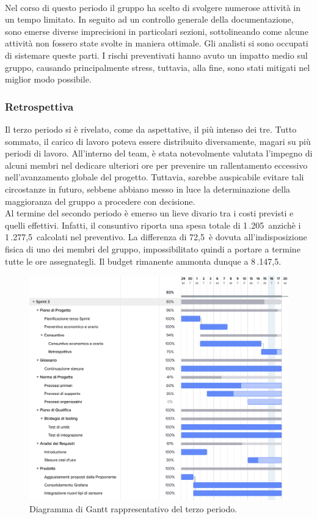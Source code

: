 \\Nel corso di questo periodo il gruppo ha scelto di svolgere numerose attivit\`{a} in un tempo limitato.
In seguito ad un controllo generale della documentazione, sono emerse diverse imprecisioni in
particolari sezioni, sottolineando come alcune attivit\`{a} non fossero state svolte in maniera
ottimale. Gli analisti si sono occupati di sistemare queste parti. I rischi preventivati hanno avuto un impatto medio sul gruppo, causando principalmente stress, tuttavia, alla fine, sono stati mitigati nel miglior modo possibile.
\subsubsection{Retrospettiva}
Il terzo periodo si è rivelato, come da aspettative, il pi\`{u} intenso dei tre. Tutto sommato, il
carico di lavoro poteva essere distribuito diversamente, magari su pi\`{u} periodi di lavoro.
All'interno del team, è stata notevolmente valutata l'impegno di alcuni membri nel dedicare
ulteriori ore per prevenire un rallentamento eccessivo nell'avanzamento globale del progetto.
Tuttavia, sarebbe auspicabile evitare tali circostanze in futuro, sebbene abbiano messo in luce la
determinazione della maggioranza del gruppo a procedere con decisione.\\
Al termine del secondo periodo è emerso un lieve divario tra i costi previsti e quelli effettivi.
Infatti, il consuntivo riporta una spesa totale di 1\,.205\;\texteuro\ anzichè i 1\,.277,5\;\texteuro\ calcolati
nel preventivo. La differenza di 72,5\;\texteuro\ è dovuta all'indisposizione fisica di uno dei membri del gruppo, impossibilitato quindi a portare a termine tutte le ore assegnategli. Il budget rimanente ammonta dunque a 8\,.147,5\;\texteuro.
\begin{figure}[h!]
    \centering
    \includegraphics[width=13cm]{./asset/gantt3.png}
    \caption{Diagramma di Gantt rappresentativo del terzo periodo.}
\end{figure}
\clearpage
